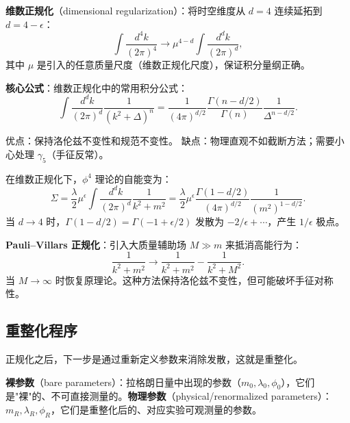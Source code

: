 \begin{example}[维数正规化]
\textbf{维数正规化}（dimensional regularization）：将时空维度从 $d=4$ 连续延拓到 $d = 4 - \epsilon$：
\begin{equation}
    \int \frac{d^4 k}{(2\pi)^4} \to \mu^{4-d}\int \frac{d^d k}{(2\pi)^d},
\end{equation}
其中 $\mu$ 是引入的任意质量尺度（维数正规化尺度），保证积分量纲正确。

\textbf{核心公式}：维数正规化中的常用积分公式：
\begin{equation}
    \int \frac{d^d k}{(2\pi)^d}\frac{1}{(k^2+\Delta)^n} = \frac{1}{(4\pi)^{d/2}}\frac{\Gamma(n-d/2)}{\Gamma(n)}\frac{1}{\Delta^{n-d/2}}.
\end{equation}

优点：保持洛伦兹不变性和规范不变性。
缺点：物理直观不如截断方法；需要小心处理 $\gamma_5$（手征反常）。

在维数正规化下，$\phi^4$ 理论的自能变为：
\begin{equation}
    \Sigma = \frac{\lambda}{2}\mu^\epsilon\int\frac{d^d k}{(2\pi)^d}\frac{1}{k^2+m^2} = \frac{\lambda}{2}\mu^\epsilon\frac{\Gamma(1-d/2)}{(4\pi)^{d/2}}\frac{1}{(m^2)^{1-d/2}}.
\end{equation}
当 $d \to 4$ 时，$\Gamma(1-d/2) = \Gamma(-1+\epsilon/2)$ 发散为 $-2/\epsilon + \cdots$，产生 $1/\epsilon$ 极点。
\end{example}

\begin{remark}
\textbf{Pauli--Villars 正规化}：引入大质量辅助场 $M \gg m$ 来抵消高能行为：
\begin{equation}
    \frac{1}{k^2+m^2} \to \frac{1}{k^2+m^2} - \frac{1}{k^2+M^2}.
\end{equation}
当 $M \to \infty$ 时恢复原理论。这种方法保持洛伦兹不变性，但可能破坏手征对称性。
\end{remark}


\subsection{重整化程序}

正规化之后，下一步是通过重新定义参数来消除发散，这就是重整化。

\begin{definition}[裸参数与物理参数]
\textbf{裸参数}（bare parameters）：拉格朗日量中出现的参数（$m_0, \lambda_0, \phi_0$），它们是"裸"的、不可直接测量的。\textbf{物理参数}（physical/renormalized parameters）：$m_R, \lambda_R, \phi_R$，它们是重整化后的、对应实验可观测量的参数。
\end{definition}

